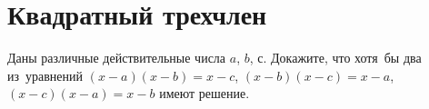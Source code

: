 
\section*{Квадратный трехчлен}


\begin{problems}





\item
Даны различные действительные числа $a$, $b$, $с$.
Докажите, что хотя~бы два из~уравнений
$(x - a) (x - b) = x - c$, $(x - b) (x - c) = x - a$, $(x - c) (x - a) = x - b$
имеют решение.



\end{problems}
